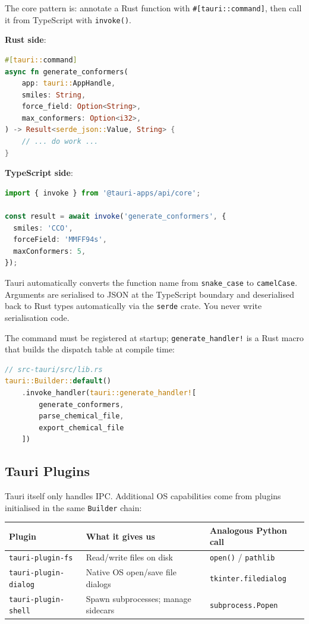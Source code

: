\documentclass[11pt,a4paper]{article}
\begin{document}
The core pattern is: annotate a Rust function with \lstinline|#[tauri::command]|,
then call it from TypeScript with \lstinline|invoke()|.

\textbf{Rust side}:
\begin{lstlisting}[language=Rust]
#[tauri::command]
async fn generate_conformers(
    app: tauri::AppHandle,
    smiles: String,
    force_field: Option<String>,
    max_conformers: Option<i32>,
) -> Result<serde_json::Value, String> {
    // ... do work ...
}
\end{lstlisting}

\textbf{TypeScript side}:
\begin{lstlisting}[language=TypeScript]
import { invoke } from '@tauri-apps/api/core';

const result = await invoke('generate_conformers', {
  smiles: 'CCO',
  forceField: 'MMFF94s',
  maxConformers: 5,
});
\end{lstlisting}

Tauri automatically converts the function name from \texttt{snake\_case} to
\texttt{camelCase}. Arguments are serialised to JSON at the TypeScript boundary and
deserialised back to Rust types automatically via the \texttt{serde} crate. You never
write serialisation code.

The command must be registered at startup; \lstinline|generate_handler!| is a Rust
macro that builds the dispatch table at compile time:

\begin{lstlisting}[language=Rust]
// src-tauri/src/lib.rs
tauri::Builder::default()
    .invoke_handler(tauri::generate_handler![
        generate_conformers,
        parse_chemical_file,
        export_chemical_file
    ])
\end{lstlisting}

\subsection{Tauri Plugins}

Tauri itself only handles IPC. Additional OS capabilities come from plugins
initialised in the same \texttt{Builder} chain:

\begin{table}[h!]
\centering
\begin{tabularx}{\textwidth}{@{} l l X @{}}
\toprule
\textbf{Plugin} & \textbf{What it gives us} & \textbf{Analogous Python call} \\
\midrule
\texttt{tauri-plugin-fs}     & Read/write files on disk & \texttt{open()} / \texttt{pathlib} \\
\texttt{tauri-plugin-dialog} & Native OS open/save file dialogs & \texttt{tkinter.filedialog} \\
\texttt{tauri-plugin-shell}  & Spawn subprocesses; manage sidecars & \texttt{subprocess.Popen} \\
\bottomrule
\end{tabularx}
\end{table}
\end{document}
